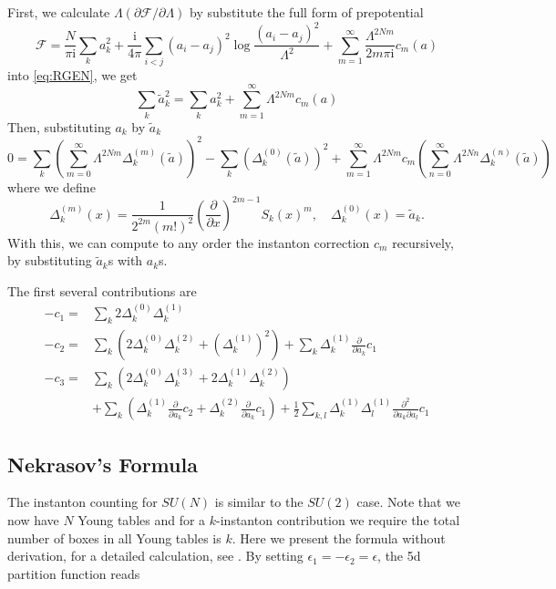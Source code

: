 \documentclass{article}
\begin{document}
First, we calculate $\Lambda(\partial\mathscr{F}/\partial\Lambda)$ by substitute the full form of prepotential 
\begin{equation}
\mathscr{F}=\frac{N}{\pi \mathrm{i}} \sum_k a_{k}^{2}+\frac{\mathrm{i}}{4 \pi} \sum_{i<j}\left(a_{i}-a_{j}\right)^{2} \log \frac{\left(a_{i}-a_{j}\right)^{2}}{\Lambda^{2}}+\sum_{m=1}^{\infty} \frac{\Lambda^{2 N m}}{2 m \pi \mathrm{i}} c_m(a)
\end{equation}
into \eqref{eq:RGEN}, we get 
\begin{equation}
\sum_k \tilde{a}_{k}^{2}=\sum_k a_{k}^{2}+\sum_{m=1}^{\infty} \Lambda^{2 N m} c_m(a)
\end{equation}
Then, substituting $a_k$ by $\tilde{a}_k$
\begin{equation}
0=\sum_{k}\left(\sum_{m=0}^{\infty} \Lambda^{2 N m} \Delta_{k}^{(m)}(\tilde{a})\right)^{2}-\sum_{k}\left(\Delta_{k}^{(0)}(\tilde{a})\right)^{2}+\sum_{m=1}^{\infty} \Lambda^{2 N m} c_{m}\left(\sum_{n=0}^{\infty} \Lambda^{2 N n} \Delta_{k}^{(n)}(\tilde{a})\right)
\end{equation}
where we define
\begin{equation}
\Delta_{k}^{(m)}(x)=\frac{1}{2^{2 m}(m !)^{2}}\left(\frac{\partial}{\partial x}\right)^{2 m-1} S_{k}(x)^{m},\quad \Delta_{k}^{(0)}(x)=\tilde{a}_k.
\end{equation}
With this, we can compute to any order the instanton correction $c_m$ recursively, by substituting $\tilde{a}_k$s with $a_k$s.

The first several contributions are 
\begin{equation}
\begin{aligned}
\label{eq:recursion}
-c_1=& \sum_k 2 \Delta_{k}^{(0)} \Delta_{k}^{(1)} \\
-c_2=& \sum_k \left(2 \Delta_{k}^{(0)} \Delta_{k}^{(2)}+\left(\Delta_{k}^{(1)}\right)^{2}\right)+\sum_k  \Delta_{k}^{(1)} \frac{\partial}{\partial a_{k}} c_{1} \\
-c_3=& \sum_k \left(2 \Delta_{k}^{(0)} \Delta_{k}^{(3)}+2 \Delta_{k}^{(1)} \Delta_{k}^{(2)}\right) \\
&+\sum_k \left(\Delta_{k}^{(1)} \frac{\partial}{\partial a_{k}} c_2+\Delta_{k}^{(2)} \frac{\partial}{\partial a_{k}} c_1\right)+\frac{1}{2} \sum_{k,l} \Delta_{k}^{(1)} \Delta_{l}^{(1)} \frac{\partial^{2}}{\partial a_{k} \partial a_{l}} c_1
\end{aligned}
\end{equation}

\subsection{Nekrasov's Formula}
The instanton counting for $SU(N)$ is similar to the $SU(2)$ case. Note that we now have $N$ Young tables and for a $k$-instanton contribution we require the total number of boxes in all Young tables is $k$. Here we present the formula without derivation, for a detailed calculation, see \cite{Nekrasov:2002qd,Moore:1997dj}. By setting $\epsilon_1=-\epsilon_2=\epsilon$, the 5d partition function reads
\end{document}
